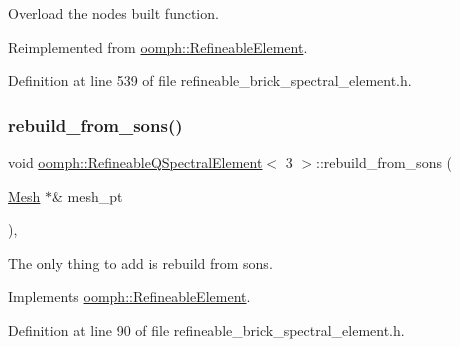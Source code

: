Overload the nodes built function. 



Reimplemented from \hyperlink{classoomph_1_1RefineableElement_a50758228db823d72ea8da23dbb000901}{oomph\+::\+Refineable\+Element}.



Definition at line 539 of file refineable\+\_\+brick\+\_\+spectral\+\_\+element.\+h.

\mbox{\label{classoomph_1_1RefineableQSpectralElement_3_013_01_4_a57a4a5ac247be0030de74d6ca7f5bdab}} 
\subsubsection{\texorpdfstring{rebuild\+\_\+from\+\_\+sons()}{rebuild\_from\_sons()}}
{\footnotesize\ttfamily void \hyperlink{classoomph_1_1RefineableQSpectralElement}{oomph\+::\+Refineable\+Q\+Spectral\+Element}$<$ 3 $>$\+::rebuild\+\_\+from\+\_\+sons (\begin{DoxyParamCaption}\item[{\hyperlink{classoomph_1_1Mesh}{Mesh} $\ast$\&}]{mesh\+\_\+pt }\end{DoxyParamCaption})\hspace{0.3cm}{\ttfamily [inline]}, {\ttfamily [virtual]}}



The only thing to add is rebuild from sons. 



Implements \hyperlink{classoomph_1_1RefineableElement_a33324be27833fa4b78279d17158215fa}{oomph\+::\+Refineable\+Element}.



Definition at line 90 of file refineable\+\_\+brick\+\_\+spectral\+\_\+element.\+h.



